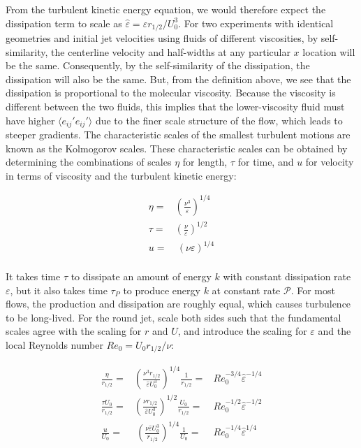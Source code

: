 \documentclass[10pt]{article}
\newcommand{\beqa}{\begin{equation}\begin{aligned}}
\newcommand{\eeqa}{\end{aligned}\end{equation}}
\newcommand{\la}{\langle}
\newcommand{\ra}{\rangle}
\begin{document}
\begin{flushleft}
From the turbulent kinetic energy equation, we would therefore expect the dissipation term to scale as \(\hat{\varepsilon}=\varepsilon r_{1/2}/U_0^3\). For two experiments with identical geometries and initial jet velocities using fluids of different viscosities, by self-similarity, the centerline velocity and half-widths at any particular \(x\) location will be the same. Consequently, by the self-similarity of the dissipation, the dissipation will also be the same. But, from the definition above, we see that the dissipation is proportional to the molecular viscosity. Because the viscosity is different between the two fluids, this implies that the lower-viscosity fluid must have higher \(\la e_{ij}'e_{ij}'\ra\) due to the finer scale structure of the flow, which leads to steeper gradients. The characteristic scales of the smallest turbulent motions are known as the Kolmogorov scales. These characteristic scales can be obtained by determining the combinations of scales \(\eta\) for length, \(\tau\) for time, and \(u\) for velocity in terms of viscosity and the turbulent kinetic energy:

\beqa
\eta=&\left(\frac{\nu^3}{\varepsilon}\right)^{1/4}\\
\tau=&\left(\frac{\nu}{\varepsilon}\right)^{1/2}\\
u=&\ (\nu\varepsilon)^{1/4}\\
\eeqa

It takes time \(\tau\) to dissipate an amount of energy \(k\) with constant dissipation rate \(\varepsilon\), but it also takes time \(\tau_P\) to produce energy \(k\) at constant rate \(\mathscr{P}\). For most flows, the production and dissipation are roughly equal, which causes turbulence to be long-lived. For the round jet, scale both sides such that the fundamental scales agree with the scaling for \(r\) and \(U\), and introduce the scaling for \(\varepsilon\) and the local Reynolds number \(Re_0=U_0r_{1/2}/\nu\):

\beqa
\frac{\eta}{r_{1/2}}=&\left(\frac{\nu^3r_{1/2}}{\hat{\varepsilon}U_0^3}\right)^{1/4}\frac{1}{r_{1/2}}=&Re_0^{-3/4}\hat{\varepsilon}^{-1/4}\\
\frac{\tau U_0}{r_{1/2}}=&\left(\frac{\nu r_{1/2}}{\hat{\varepsilon}U_0^3}\right)^{1/2}\frac{U_0}{r_{1/2}}=&Re_0^{-1/2}\hat{\varepsilon}^{-1/2}\\
\frac{u}{U_0}=&\ (\frac{\nu\hat{\varepsilon}U_0^3}{r_{1/2}})^{1/4}\frac{1}{U_0}=&Re_0^{-1/4}\hat{\varepsilon}^{1/4}\\
\eeqa


\end{flushleft}
\end{document}
